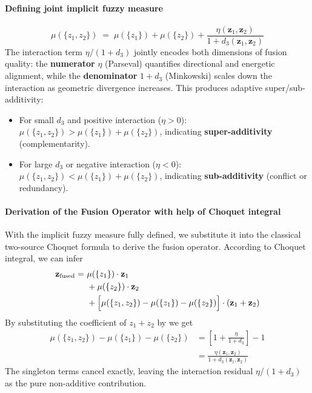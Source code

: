 \documentclass[preprint,12pt]{elsarticle}
\begin{document}
\paragraph{Defining joint implicit fuzzy measure }
\begin{equation*}
    \mu(\{z_1, z_2\}) \;=\; \mu(\{z_1\}) + \mu(\{z_2\}) + \frac{\eta(\mathbf{z}_1, \mathbf{z}_2)}{1 + d_3(\mathbf{z}_1, \mathbf{z}_2)}
\end{equation*}
The interaction term $\eta/(1{+}d_3)$ jointly encodes both dimensions of fusion quality: the \textbf{numerator} $\eta$ (Parseval) quantifies directional and energetic alignment, while the \textbf{denominator} $1+d_3$ (Minkowski) scales down the interaction as geometric divergence increases. This produces adaptive super/sub-additivity:
\begin{itemize}
    \item For small $d_3$ and positive interaction ($\eta > 0$): $\mu(\{z_1, z_2\}) > \mu(\{z_1\}) + \mu(\{z_2\})$, indicating \textbf{super-additivity} (complementarity).
    \item For large $d_3$ or negative interaction ($\eta < 0$): $\mu(\{z_1, z_2\}) < \mu(\{z_1\}) + \mu(\{z_2\})$, indicating \textbf{sub-additivity} (conflict or redundancy).
\end{itemize}

\paragraph{Derivation of the Fusion Operator with help of Choquet integral}
With the implicit fuzzy measure fully defined, we substitute it into the classical two-source Choquet formula to derive the fusion operator. According to Choquet integral, we can infer
\begin{equation*}
\begin{aligned}
    \mathbf{z}_{\text{fused}} = \,\, & \mu(\{z_1\}) \cdot \mathbf{z}_1 \\
    & + \mu(\{z_2\}) \cdot \mathbf{z}_2 \\
    & + \Bigl[ \mu(\{z_1, z_2\}) - \mu(\{z_1\}) - \mu(\{z_2\}) \Bigr] \cdot (\mathbf{z}_1 + \mathbf{z}_2)
\end{aligned}
\end{equation*}
 By substituting the coefficient of $z_1+z_2$ by we get
\begin{equation*}
\begin{aligned}
    \mu(\{z_1, z_2\}) - \mu(\{z_1\}) - \mu(\{z_2\}) &= \left[ 1 + \frac{\eta}{1+d_3} \right] - 1 \\
    &= \frac{\eta(\mathbf{z}_1, \mathbf{z}_2)}{1 + d_3(\mathbf{z}_1, \mathbf{z}_2)}
\end{aligned}
\end{equation*}
The singleton terms cancel exactly, leaving the interaction residual $\eta/(1+d_3)$ as the pure non-additive contribution.
\end{document}

